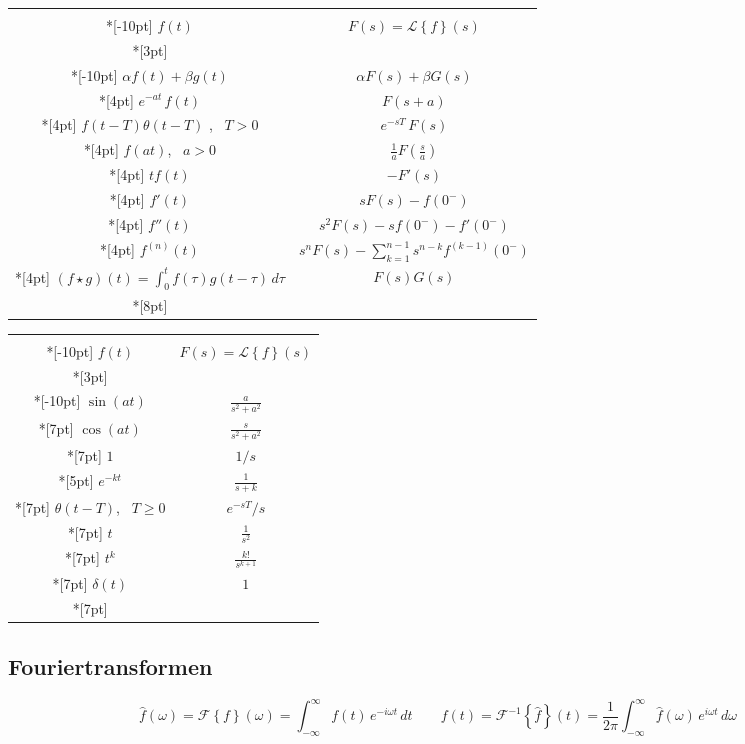 \documentclass{article}
\def\Fourier#1{\mathcal F\left\{#1\right\}}
\def\Laplace#1{\mathcal L\left\{#1\right\}}
\def\invFourier#1{\mathcal F^{-1}\left\{#1\right\}}
\let\invFF\invFourier
\let\FF\Fourier
\let\LL\Laplace
\def\tfrac{\textstyle\frac}
\begin{document}
\begin{tabular}[t]{|c|c|}
 \hline & \\*[-10pt]
 $  f(t) $      & $ F(s) = \LL f(s) $ 
 \\*[3pt]\hline  & \\*[-10pt]
 $\alpha f(t)+\beta g(t)$ & $\alpha F(s) + \beta G(s)$ 
 \\*[4pt]
 $e^{-at}\,f(t)$ & $F(s+a)$ 
 \\*[4pt]
 $f(t-T)\theta(t-T)$ , \  $T>0$ & $e^{-sT}\, F(s)$
 \\*[4pt]
 $f(at)$, \ $a>0$ & $\tfrac1a F(\tfrac s a)$
 \\*[4pt]
 $tf(t)$ & $-F'(s)$ 
 \\*[4pt]
 $f'(t)$ & $sF(s) - f(0^-)$ 
 \\*[4pt]
 $f''(t)$ & $s^2F(s) - sf(0^-)-f'(0^-)$ 
 \\*[4pt]
 $f^{(n)}(t)$ & $s^nF(s) - \sum_{k=1}^{n-1}s^{n-k}f^{(k-1)}(0^-)$ 
 \\*[4pt]
 $(f\star g)(t)=\int_0^t f(\tau)g(t-\tau)\, d\tau$ & $F(s)G(s)$ 
 \\*[8pt]
 \hline
 \end{tabular}
 \hfil
\begin{tabular}[t]{|c|c|}
 \hline & \\*[-10pt]
 $  f(t) $      & $ F(s) = \LL f(s) $ 
\\*[3pt]\hline  & \\*[-10pt]
 $\sin(at)$ & $\frac{a}{s^2+a^2}$ 
 \\*[7pt]
 $\cos(at)$ & $\frac{s}{s^2+a^2}$ 
 \\*[7pt]
 $1$ & $1/s$ 
 \\*[5pt]
 $e^{-kt}$ & $\frac1{s+k}$ 
 \\*[7pt]
 $\theta(t-T)$, \ $T\ge0$ & $e^{-sT}/s$
 \\*[7pt]
 $t$ & $\frac1{s^2}$ 
 \\*[7pt]
 $t^k$ & $\frac{k!}{s^{k+1}}$ 
 \\*[7pt]
 $\delta(t)$ & $1$ 
 \\*[7pt]
 \hline
\end{tabular}

\bigskip

\subsection*{Fouriertransformen}%

$$
\widehat f(\omega) = \FF{f}(\omega) = \int_{-\infty}^\infty f(t)\,e^{-i\omega t}\,dt
\qquad
f(t) = \invFF{\widehat f}(t) = \frac1{2\pi}\int_{-\infty}^\infty \widehat f(\omega)\,e^{i\omega t}\,d\omega
$$
\end{document}
